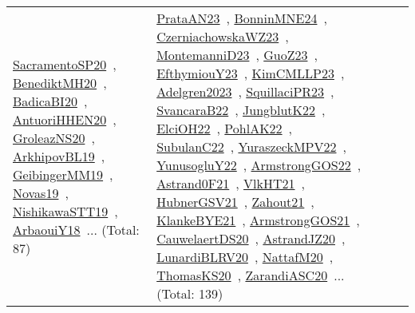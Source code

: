 {\begin{longtable}{lp{3cm}>{\raggedright\arraybackslash}p{6cm}>{\raggedright\arraybackslash}p{6cm}>{\raggedright\arraybackslash}p{8cm}}
\href{../works/SacramentoSP20.pdf}{SacramentoSP20}~\cite{SacramentoSP20}, \href{../works/BenediktMH20.pdf}{BenediktMH20}~\cite{BenediktMH20}, \href{../works/BadicaBI20.pdf}{BadicaBI20}~\cite{BadicaBI20}, \href{../works/AntuoriHHEN20.pdf}{AntuoriHHEN20}~\cite{AntuoriHHEN20}, \href{../works/GroleazNS20.pdf}{GroleazNS20}~\cite{GroleazNS20}, \href{../works/ArkhipovBL19.pdf}{ArkhipovBL19}~\cite{ArkhipovBL19}, \href{../works/GeibingerMM19.pdf}{GeibingerMM19}~\cite{GeibingerMM19}, \href{../works/Novas19.pdf}{Novas19}~\cite{Novas19}, \href{../works/NishikawaSTT19.pdf}{NishikawaSTT19}~\cite{NishikawaSTT19}, \href{../works/ArbaouiY18.pdf}{ArbaouiY18}~\cite{ArbaouiY18}... (Total: 87) & \href{../works/PrataAN23.pdf}{PrataAN23}~\cite{PrataAN23}, \href{../works/BonninMNE24.pdf}{BonninMNE24}~\cite{BonninMNE24}, \href{../works/CzerniachowskaWZ23.pdf}{CzerniachowskaWZ23}~\cite{CzerniachowskaWZ23}, \href{../works/MontemanniD23.pdf}{MontemanniD23}~\cite{MontemanniD23}, \href{../works/GuoZ23.pdf}{GuoZ23}~\cite{GuoZ23}, \href{../works/EfthymiouY23.pdf}{EfthymiouY23}~\cite{EfthymiouY23}, \href{../works/KimCMLLP23.pdf}{KimCMLLP23}~\cite{KimCMLLP23}, \href{../works/Adelgren2023.pdf}{Adelgren2023}~\cite{Adelgren2023}, \href{../works/SquillaciPR23.pdf}{SquillaciPR23}~\cite{SquillaciPR23}, \href{../works/SvancaraB22.pdf}{SvancaraB22}~\cite{SvancaraB22}, \href{../works/JungblutK22.pdf}{JungblutK22}~\cite{JungblutK22}, \href{../works/ElciOH22.pdf}{ElciOH22}~\cite{ElciOH22}, \href{../works/PohlAK22.pdf}{PohlAK22}~\cite{PohlAK22}, \href{../works/SubulanC22.pdf}{SubulanC22}~\cite{SubulanC22}, \href{../works/YuraszeckMPV22.pdf}{YuraszeckMPV22}~\cite{YuraszeckMPV22}, \href{../works/YunusogluY22.pdf}{YunusogluY22}~\cite{YunusogluY22}, \href{../works/ArmstrongGOS22.pdf}{ArmstrongGOS22}~\cite{ArmstrongGOS22}, \href{../works/Astrand0F21.pdf}{Astrand0F21}~\cite{Astrand0F21}, \href{../works/VlkHT21.pdf}{VlkHT21}~\cite{VlkHT21}, \href{../works/HubnerGSV21.pdf}{HubnerGSV21}~\cite{HubnerGSV21}, \href{../works/Zahout21.pdf}{Zahout21}~\cite{Zahout21}, \href{../works/KlankeBYE21.pdf}{KlankeBYE21}~\cite{KlankeBYE21}, \href{../works/ArmstrongGOS21.pdf}{ArmstrongGOS21}~\cite{ArmstrongGOS21}, \href{../works/CauwelaertDS20.pdf}{CauwelaertDS20}~\cite{CauwelaertDS20}, \href{../works/AstrandJZ20.pdf}{AstrandJZ20}~\cite{AstrandJZ20}, \href{../works/LunardiBLRV20.pdf}{LunardiBLRV20}~\cite{LunardiBLRV20}, \href{../works/NattafM20.pdf}{NattafM20}~\cite{NattafM20}, \href{../works/ThomasKS20.pdf}{ThomasKS20}~\cite{ThomasKS20}, \href{../works/ZarandiASC20.pdf}{ZarandiASC20}~\cite{ZarandiASC20}... (Total: 139)\\

\end{longtable}}
